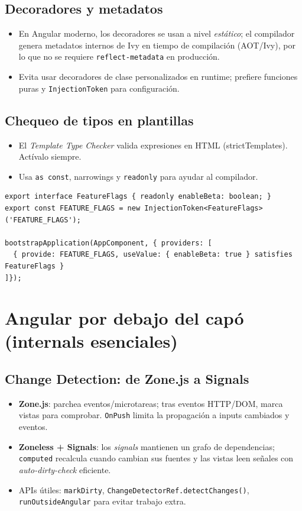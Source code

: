\documentclass[11pt,a4paper]{article}
\begin{document}
\subsection{Decoradores y metadatos}
\begin{itemize}[leftmargin=*]
  \item En Angular moderno, los decoradores se usan a nivel \emph{estático}; el compilador genera metadatos internos de Ivy en tiempo de compilación (AOT/Ivy), por lo que no se requiere \texttt{reflect-metadata} en producción.
  \item Evita usar decoradores de clase personalizados en runtime; prefiere funciones puras y \texttt{InjectionToken} para configuración.
\end{itemize}

\subsection{Chequeo de tipos en plantillas}
\begin{itemize}[leftmargin=*]
  \item El \emph{Template Type Checker} valida expresiones en HTML (strictTemplates). Actívalo siempre.
  \item Usa \texttt{as const}, narrowings y \texttt{readonly} para ayudar al compilador.
\end{itemize}

\begin{lstlisting}[style=tsstyle, caption={Tokens tipados y configuración segura}]
export interface FeatureFlags { readonly enableBeta: boolean; }
export const FEATURE_FLAGS = new InjectionToken<FeatureFlags>('FEATURE_FLAGS');

bootstrapApplication(AppComponent, { providers: [
  { provide: FEATURE_FLAGS, useValue: { enableBeta: true } satisfies FeatureFlags }
]});
\end{lstlisting}

\section{Angular por debajo del capó (internals esenciales)}
\subsection{Change Detection: de Zone.js a Signals}
\begin{itemize}[leftmargin=*]
  \item \textbf{Zone.js}: parchea eventos/microtareas; tras eventos HTTP/DOM, marca vistas para comprobar. \texttt{OnPush} limita la propagación a inputs cambiados y eventos.
  \item \textbf{Zoneless + Signals}: los \emph{signals} mantienen un grafo de dependencias; \texttt{computed} recalcula cuando cambian sus fuentes y las vistas leen señales con \emph{auto-dirty-check} eficiente.
  \item APIs útiles: \texttt{markDirty}, \texttt{ChangeDetectorRef.detectChanges()}, \texttt{runOutsideAngular} para evitar trabajo extra.
\end{itemize}
\end{document}
